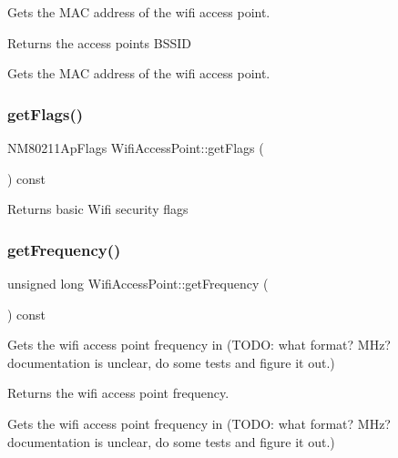 Gets the M\+AC address of the wifi access point.

\begin{DoxyReturn}{Returns}
the access point\textquotesingle{}s B\+S\+S\+ID
\end{DoxyReturn}
Gets the M\+AC address of the wifi access point. \mbox{\label{classWifiAccessPoint_a30201886e4c9c51a0b67f83de4a03665}} 
\subsubsection{\texorpdfstring{get\+Flags()}{getFlags()}}
{\footnotesize\ttfamily N\+M80211\+Ap\+Flags Wifi\+Access\+Point\+::get\+Flags (\begin{DoxyParamCaption}{ }\end{DoxyParamCaption}) const}

\begin{DoxyReturn}{Returns}
basic Wifi security flags 
\end{DoxyReturn}
\mbox{\label{classWifiAccessPoint_a4794580b1fcd5341f18bc8ca14005d8a}} 
\subsubsection{\texorpdfstring{get\+Frequency()}{getFrequency()}}
{\footnotesize\ttfamily unsigned long Wifi\+Access\+Point\+::get\+Frequency (\begin{DoxyParamCaption}{ }\end{DoxyParamCaption}) const}

Gets the wifi access point frequency in (T\+O\+DO\+: what format? M\+Hz? documentation is unclear, do some tests and figure it out.)

\begin{DoxyReturn}{Returns}
the wifi access point frequency.
\end{DoxyReturn}
Gets the wifi access point frequency in (T\+O\+DO\+: what format? M\+Hz? documentation is unclear, do some tests and figure it out.) \mbox{\label{classWifiAccessPoint_a7734b5d2ba0d5dfdb6e8fcb948856794}} 
